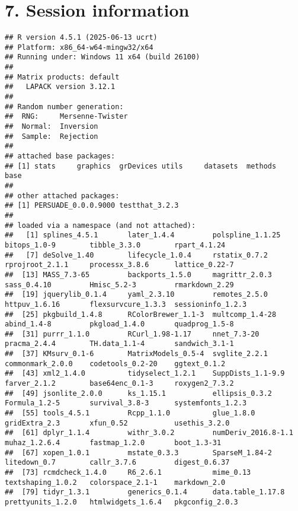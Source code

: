 \documentclass[
]{article}
\begin{document}
\clearpage

\section{7. Session information}\label{session-information}

\begin{verbatim}
## R version 4.5.1 (2025-06-13 ucrt)
## Platform: x86_64-w64-mingw32/x64
## Running under: Windows 11 x64 (build 26100)
## 
## Matrix products: default
##   LAPACK version 3.12.1
## 
## Random number generation:
##  RNG:     Mersenne-Twister 
##  Normal:  Inversion 
##  Sample:  Rejection 
##  
## attached base packages:
## [1] stats     graphics  grDevices utils     datasets  methods   base     
## 
## other attached packages:
## [1] PERSUADE_0.0.0.9000 testthat_3.2.3     
## 
## loaded via a namespace (and not attached):
##   [1] splines_4.5.1       later_1.4.4         polspline_1.1.25    bitops_1.0-9        tibble_3.3.0        rpart_4.1.24       
##   [7] deSolve_1.40        lifecycle_1.0.4     rstatix_0.7.2       rprojroot_2.1.1     processx_3.8.6      lattice_0.22-7     
##  [13] MASS_7.3-65         backports_1.5.0     magrittr_2.0.3      sass_0.4.10         Hmisc_5.2-3         rmarkdown_2.29     
##  [19] jquerylib_0.1.4     yaml_2.3.10         remotes_2.5.0       httpuv_1.6.16       flexsurvcure_1.3.3  sessioninfo_1.2.3  
##  [25] pkgbuild_1.4.8      RColorBrewer_1.1-3  multcomp_1.4-28     abind_1.4-8         pkgload_1.4.0       quadprog_1.5-8     
##  [31] purrr_1.1.0         RCurl_1.98-1.17     nnet_7.3-20         pracma_2.4.4        TH.data_1.1-4       sandwich_3.1-1     
##  [37] KMsurv_0.1-6        MatrixModels_0.5-4  svglite_2.2.1       commonmark_2.0.0    codetools_0.2-20    ggtext_0.1.2       
##  [43] xml2_1.4.0          tidyselect_1.2.1    SuppDists_1.1-9.9   farver_2.1.2        base64enc_0.1-3     roxygen2_7.3.2     
##  [49] jsonlite_2.0.0      ks_1.15.1           ellipsis_0.3.2      Formula_1.2-5       survival_3.8-3      systemfonts_1.2.3  
##  [55] tools_4.5.1         Rcpp_1.1.0          glue_1.8.0          gridExtra_2.3       xfun_0.52           usethis_3.2.0      
##  [61] dplyr_1.1.4         withr_3.0.2         numDeriv_2016.8-1.1 muhaz_1.2.6.4       fastmap_1.2.0       boot_1.3-31        
##  [67] xopen_1.0.1         mstate_0.3.3        SparseM_1.84-2      litedown_0.7        callr_3.7.6         digest_0.6.37      
##  [73] rcmdcheck_1.4.0     R6_2.6.1            mime_0.13           textshaping_1.0.2   colorspace_2.1-1    markdown_2.0       
##  [79] tidyr_1.3.1         generics_0.1.4      data.table_1.17.8   prettyunits_1.2.0   htmlwidgets_1.6.4   pkgconfig_2.0.3    

\end{verbatim}
\end{document}
